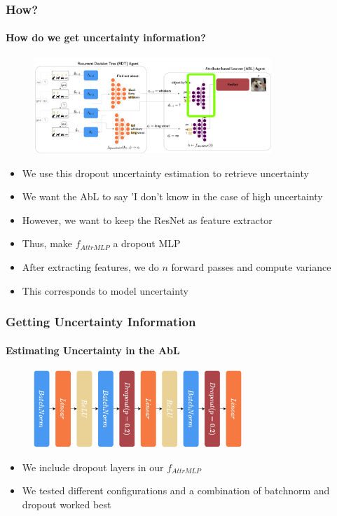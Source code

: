 \documentclass[9pt]{beamer}
\begin{document}
\begin{frame}
\frametitle{How?}
\framesubtitle{How do we get uncertainty information?}\begin{figure}
	\centering
	\includegraphics[width=0.8\textwidth]{images/where_is_uncertainty.pdf} 
\end{figure}
\begin{itemize}
	\item We use this dropout uncertainty estimation to retrieve uncertainty 
	\item We want the AbL to say 'I don't know in the case of high uncertainty
	\item However, we want to keep the ResNet as feature extractor
	\item Thus, make $f_{AttrMLP}$ a dropout MLP
	\item After extracting features, we do $n$ forward passes and compute variance
	\item This corresponds to model uncertainty
\end{itemize}
\end{frame}


\begin{frame}
\frametitle{Getting Uncertainty Information}
\framesubtitle{Estimating Uncertainty in the AbL}
\begin{figure}
	\centering
	\includegraphics[width=0.7\textwidth]{images/f_attrMLP.pdf}
\end{figure}
\begin{itemize}
	\item We include dropout layers in our $f_{AttrMLP}$
	\item We tested different configurations and a combination of batchnorm and dropout worked best
\end{itemize}
\end{frame}
\end{document}
